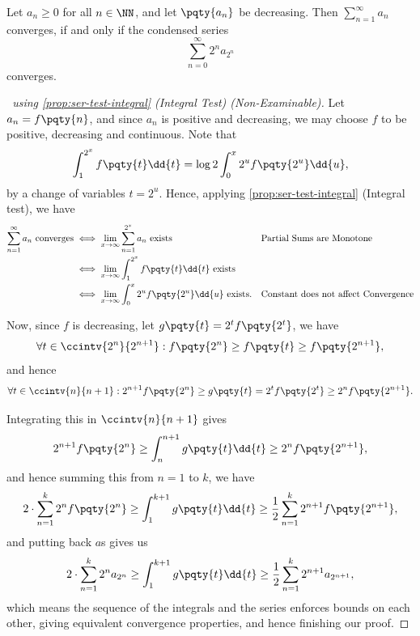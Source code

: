 \begin{proposition}
    \label{prop:ser-test-cauchy-condensation}%
    Let \(a_n \geq 0\) for all \(n \in \NN\), and let \(\pqty{a_n}\) be decreasing. Then \(\sum_{n = 1}^{\infty} a_n\) converges, if and only if the condensed series
    \[
        \sum_{n = 0}^{\infty} 2^n a_{2^n}
    \]
    converges.
\end{proposition}

\begin{proof}[\proofname\ using \autoref{prop:ser-test-integral} (Integral Test) (Non-Examinable)]
    Let \(a_n = f\pqty{n}\), and since \(a_n\) is positive and decreasing, we may choose \(f\) to be positive, decreasing and continuous. Note that
    \[
        \int_{1}^{2^x} f\pqty{t} \dd{t} = \log 2 \int_{0}^{x} 2^u f\pqty{2^u} \dd{u},
    \]
    by a change of variables \(t = 2^u\). Hence, applying \autoref{prop:ser-test-integral} (Integral test), we have
    \begin{align*}
        \sum_{n = 1}^{\infty} a_n \text{ converges} &\iff \lim_{x \to \infty} \sum_{n = 1}^{2^x} a_n \text{ exists} && \text{Partial Sums are Monotone}\\
        &\iff \lim_{x \to \infty} \int_{1}^{2^x} f\pqty{t} \dd{t} \text{ exists} \\
        &\iff \lim_{x \to \infty} \int_{0}^{x} 2^u f\pqty{2^u} \dd{u} \text{ exists.} && \text{Constant does not affect Convergence}
    \end{align*}

    Now, since \(f\) is decreasing, let \(g\pqty{t} = 2^t f\pqty{2^t}\), we have
    \[
        \forall t \in \ccintv{2^n}{2^{n + 1}}: f\pqty{2^n} \geq f\pqty{t} \geq f\pqty{2^{n + 1}},
    \]
    and hence
    \[
        \forall t \in \ccintv{n}{n + 1}: 2^{n + 1} f\pqty{2^n} \geq g\pqty{t} = 2^t f\pqty{2^t} \geq 2^n f\pqty{2^{n + 1}}.
    \]

    Integrating this in \(\ccintv{n}{n + 1}\) gives
    \[
        2^{n + 1} f\pqty{2^n} \geq \int_{n}^{n + 1} g\pqty{t} \dd{t} \geq 2^n f\pqty{2^{n + 1}},
    \]
    and hence summing this from \(n = 1\) to \(k\), we have
    \[
        2 \cdot \sum_{n = 1}^{k} 2^n f\pqty{2^n} \geq \int_{1}^{k + 1} g\pqty{t} \dd{t} \geq \frac{1}{2} \sum_{n = 1}^{k} 2^{n + 1} f\pqty{2^{n + 1}},
    \]
    and putting back \(a\)s gives us
    \[
        2 \cdot \sum_{n = 1}^{k} 2^n a_{2^n} \geq \int_{1}^{k + 1} g\pqty{t} \dd{t} \geq \frac{1}{2} \sum_{n = 1}^{k} 2^{n + 1} a_{2^{n + 1}},
    \]
    which means the sequence of the integrals and the series enforces bounds on  each other, giving equivalent convergence properties, and hence finishing our proof.
\end{proof}

